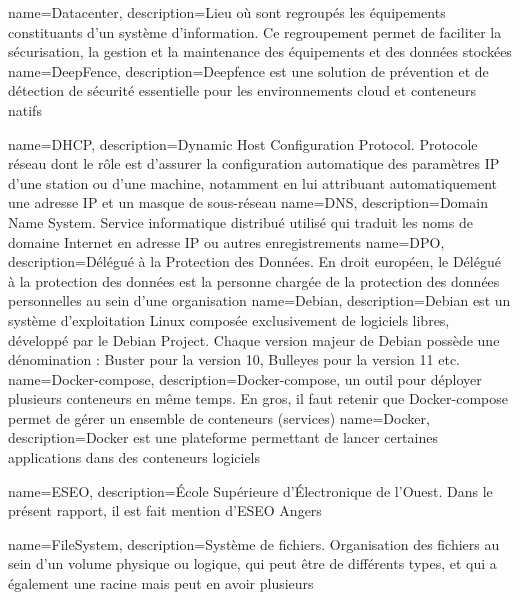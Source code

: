 {
    name=Datacenter,
    description={Lieu où sont regroupés les équipements constituants d'un système d'information. Ce regroupement permet de faciliter la sécurisation, la gestion et la maintenance des équipements et des données stockées}
}
{
    name=DeepFence,
    description={Deepfence est une solution de prévention et de détection de sécurité essentielle pour les environnements cloud et conteneurs natifs}
}

{
    name=DHCP,
    description={Dynamic Host Configuration Protocol. Protocole réseau dont le rôle est d’assurer la configuration automatique des paramètres IP d’une station ou d'une machine, notamment en lui attribuant automatiquement une adresse IP et un masque de sous-réseau}
}
{
    name=DNS,
    description={Domain Name System. Service informatique distribué utilisé qui traduit les noms de domaine Internet en adresse IP ou autres enregistrements}
}
{
    name=DPO,
    description={Délégué à la Protection des Données. En droit européen, le Délégué à la protection des données est la personne chargée de la protection des données personnelles au sein d'une organisation}
}
{
    name=Debian,
    description={Debian est un système d’exploitation Linux composée exclusivement de logiciels libres, développé par le Debian Project. Chaque version majeur de Debian possède une dénomination : Buster pour la version 10, Bulleyes pour la version 11 etc.}
}
{
    name=Docker-compose,
    description={Docker-compose, un outil pour déployer plusieurs conteneurs en même temps. En gros, il faut retenir que Docker-compose permet de gérer un ensemble de conteneurs (services)}
}
{
    name=Docker,
    description={Docker est une plateforme permettant de lancer certaines applications dans des conteneurs logiciels}
}

{
    name=ESEO,
    description={École Supérieure d'Électronique de l'Ouest. Dans le présent rapport, il est fait mention d'ESEO Angers}
}

{
    name=FileSystem,
    description={Système de fichiers. Organisation des fichiers au sein d'un volume physique ou logique, qui peut être de différents types, et qui a également une racine mais peut en avoir plusieurs}
}

